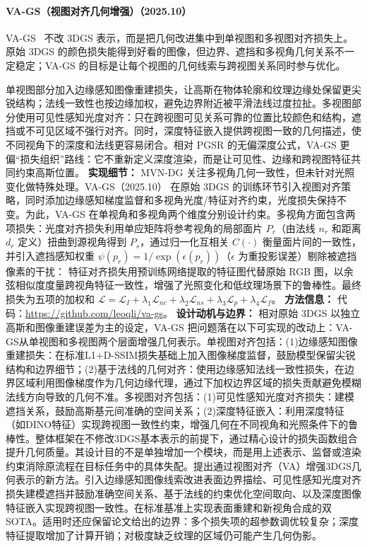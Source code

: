 \paragraph{VA-GS（视图对齐几何增强）（2025.10）}
VA-GS~\cite{2510_11473} 不改 3DGS 表示，而是把几何改进集中到单视图和多视图对齐损失上。原始 3DGS 的颜色损失能得到好看的图像，但边界、遮挡和多视角几何关系不一定稳定；VA-GS 的目标是让每个视图的几何线索与跨视图关系同时参与优化。

单视图部分加入边缘感知图像重建损失，让高斯在物体轮廓和纹理边缘处保留更尖锐结构；法线一致性也按边缘加权，避免边界附近被平滑法线过度拉扯。多视图部分使用可见性感知光度对齐：只在跨视图可见关系可靠的位置比较颜色和结构，遮挡或不可见区域不强行对齐。同时，深度特征嵌入提供跨视图一致的几何描述，使不同视角下的深度和法线更容易闭合。相对 PGSR 的无偏深度公式，VA-GS 更偏“损失组织”路线：它不重新定义深度渲染，而是让可见性、边缘和跨视图特征共同约束高斯位置。
\textbf{实现细节：} MVN-DG 关注多视角几何一致性，但未针对光照变化做特殊处理。VA-GS（2025.10） 在原始 3DGS 的训练环节引入视图对齐策略，同时添加边缘感知梯度监督和多视角光度/特征对齐约束，光度损失保持不变。为此，VA-GS 在单视角和多视角两个维度分别设计约束。多视角方面包含两项损失：光度对齐损失利用单应矩阵将参考视角的局部面片 $P_r$（由法线 $n_r$ 和距离 $d_r$ 定义）扭曲到源视角得到 $P_s$，通过归一化互相关 $C(\cdot)$ 衡量面片间的一致性，并引入遮挡感知权重 $\psi(p_r) = 1/\exp(\epsilon(p_r))$（$\epsilon$ 为重投影误差）剔除被遮挡像素的干扰： 特征对齐损失用预训练网络提取的特征图代替原始 RGB 图，以余弦相似度度量跨视角特征一致性，增强了光照变化和低纹理场景下的鲁棒性。最终损失为五项的加权和 $\mathcal{L} = \mathcal{L}_I + \lambda_1 \mathcal{L}_{nc} + \lambda_2 \mathcal{L}_{ns} + \lambda_3 \mathcal{L}_p + \lambda_4 \mathcal{L}_f$。
\textbf{方法信息：} 代码：\url{https://github.com/leoqli/va-gs}。
\textbf{设计动机与边界：} 相对原始 3DGS 以独立高斯和图像重建误差为主的设定，VA-GS 把问题落在以下可实现的改动上：VA-GS从单视图和多视图两个层面增强几何表示。单视图对齐包括：(1)边缘感知图像重建损失：在标准L1+D-SSIM损失基础上加入图像梯度监督，鼓励模型保留尖锐结构和边界细节；(2)基于法线的几何对齐：使用边缘感知法线一致性损失，在边界区域利用图像梯度作为几何边缘代理，通过下加权边界区域的损失贡献避免模糊法线方向导致的几何不准。多视图对齐包括：(1)可见性感知光度对齐损失：建模遮挡关系，鼓励高斯基元间准确的空间关系；(2)深度特征嵌入：利用深度特征（如DINO特征）实现跨视图一致性约束，增强几何在不同视角和光照条件下的鲁棒性。整体框架在不修改3DGS基本表示的前提下，通过精心设计的损失函数组合提升几何质量。其设计目的不是单独增加一个模块，而是用上述表示、监督或渲染约束消除原流程在目标任务中的具体失配。提出通过视图对齐（VA）增强3DGS几何表示的新方法。引入边缘感知图像线索改进表面边界描绘、可见性感知光度对齐损失建模遮挡并鼓励准确空间关系、基于法线的约束优化空间取向、以及深度图像特征嵌入实现跨视图一致性。在标准基准上实现表面重建和新视角合成的双SOTA。适用时还应保留论文给出的边界：多个损失项的超参数调优较复杂；深度特征提取增加了计算开销；对极度缺乏纹理的区域仍可能产生几何伪影。
